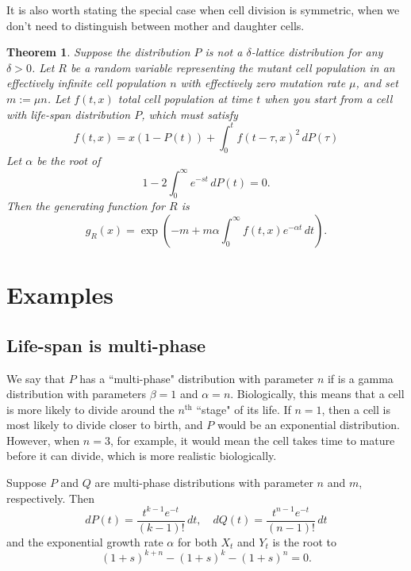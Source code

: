 \documentclass[12pt]{amsart}
\theoremstyle{plain}
\newtheorem{thm}{Theorem}[section]
\theoremstyle{definition}
\theoremstyle{remark}
\theoremstyle{definition}
\begin{document}
It is also worth stating the special case when cell division is symmetric, when we don't need to distinguish between mother and daughter cells.

\begin{thm} \label{singleMutantDist}
Suppose the distribution $P$ is not a $\delta$-lattice distribution for any $\delta>0$.  Let $R$ be a random variable representing the mutant cell population in an effectively infinite cell population $n$ with effectively zero mutation rate $\mu$, and set $m := \mu n$. Let $f(t,x)$ total cell population at time $t$ when you start from a cell with life-span distribution $P$, which must satisfy
\begin{equation}
f(t,x) = x(1-P(t)) + \int_0^t f(t-\tau,x)^2 \, dP(\tau)
\end{equation}
Let $\alpha$ be the root of
\begin{equation}
1- 2\int_0^\infty e^{-st} \, dP(t) = 0.
\end{equation}
Then the generating function for $R$ is
\begin{equation}
g_R(x) = \exp \left(-m + m \alpha \int_0^\infty f(t,x) e^{-\alpha t} \, dt \right). \label{gr2single}
\end{equation}
\end{thm}

\section{Examples} \label{MutantExamples}

\subsection{Life-span is multi-phase}

We say that $P$ has a ``multi-phase" distribution with parameter $n$ if is a gamma distribution with parameters $\beta = 1$ and $\alpha=n$. Biologically, this means that a cell is more likely to divide around the $n^{\text{th}}$ ``stage" of its life. If $n=1$, then a cell is most likely to divide closer to birth, and $P$ would be an exponential distribution. However, when $n=3$, for example, it would mean the cell takes time to mature before it can divide, which is more realistic biologically.

Suppose $P$ and $Q$ are multi-phase distributions with parameter $n$ and $m$, respectively. Then
\begin{equation}
dP(t) = \frac{t^{k-1}e^{-t}}{(k-1)!}\, dt, \quad
dQ(t) = \frac{t^{n-1}e^{-t}}{(n-1)!}\, dt
\end{equation}
and the exponential growth rate $\alpha$ for both $X_t$ and $Y_t$ is the root to
\begin{equation}
{(1+s)}^{k+n} - {(1+s)}^k - {(1+s)}^n = 0.
\end{equation}
\end{document}
